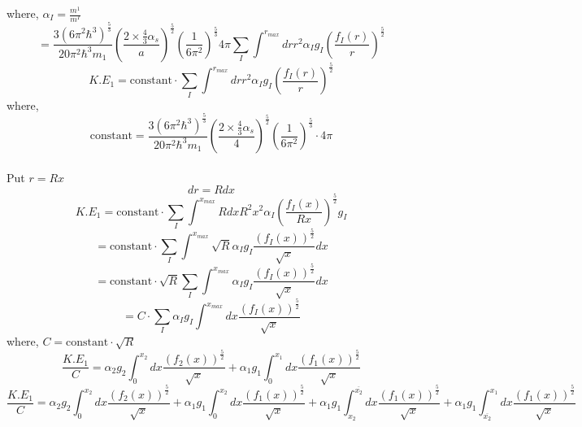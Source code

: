 \documentclass[fleqn, 10pt]{article}
\begin{document}
 where, $\alpha_{I} = \frac{m^{1}}{m^{I}}$
\begin{equation*}
    =  \frac{3(6\pi^{2}\hbar^{3})^\frac{5}{3}}{20 \pi^{2}\hbar^{3}m_{1}} \left( \frac{2 \times \frac{4}{3} \alpha_{s}}{a}\right)^\frac{5}{2} \left( \frac{1}{6\pi^{2}}\right)^\frac{5}{3} 4 \pi \sum_{I} \int^{r_{max}} dr r^{2}\alpha_{I}g_{I} \left( \frac{f_{I}(r)}{r}\right)^\frac{5}{2}
\end{equation*}
\begin{equation}
    K.E_{1} = \text{constant} \cdot \sum_{I} \int^{r_{max}} dr r^{2} \alpha_{I} g_{I} \left( \frac{f_{I}(r)}{r}\right)^\frac{5}{2}
\end{equation}
where, 
\[ \text{constant} = \frac{3 \left( 6 \pi^{2} \hbar^{3} \right)^\frac{5}{3}}{20 \pi^{2} \hbar^{3} m_{1}}  \left( \frac{2 \times \frac{4}{3}\alpha_{s}}{4} \right)^\frac{5}{2} \left( \frac{1}{6\pi^{2}}\right)^\frac{5}{3} \cdot 4 \pi  \] 
\\
Put   $r = Rx$
\[ dr = R dx \]
\begin{equation*}
    K.E_{1} = \text{constant} \cdot \sum_{I} \int^{x_{max}} R dx R^{2} x^{2} \alpha_{I} \left( \frac{f_{I}(x)}{Rx}\right)^\frac{5}{2} g_{I}
\end{equation*}
\begin{equation*}
     = \text{constant} \cdot \sum_{I} \int^{x_{max}} \sqrt{R} \alpha_{I} g_{I} \frac{\left( f_{I}(x)\right)^\frac{5}{2}}{\sqrt{x}} dx 
\end{equation*}
\begin{equation*}
    = \text{constant} \cdot \sqrt{R} \sum_{I} \int^{x_{max}} \alpha_{I} g_{I} \frac{\left( f_{I}(x)\right)^\frac{5}{2}}{\sqrt{x}} dx 
    \end{equation*}
\begin{equation}
     = C \cdot \sum_{I} \alpha_{I} g_{I} \int^{x_{max}} dx \frac{\left( f_{I}(x)\right)^\frac{5}{2}}{\sqrt{x}}
     \end{equation}
where, $ C = \text{constant} \cdot \sqrt{R} $
\begin{equation*}
    \frac{K.E_{1}}{C} = \alpha_{2} g_{2} \int^{x_{2}}_{0} dx \frac{\left( f_{2}(x)\right)^\frac{5}{2}}{\sqrt{x}} + \alpha_{1} g_{1} \int^{x_{1}}_{0} dx \frac{\left( f_{1}(x)\right)^\frac{5}{2}}{\sqrt{x}}
\end{equation*}
\begin{equation*}
    \frac{K.E_{1}}{C}  = \alpha_{2}g_{2} \int^{x_{2}}_{0} dx \frac{\left( f_{2}(x)\right)^\frac{5}{2}}{\sqrt{x}}  + \alpha_{1}g_{1} \int^{x_{2}}_{0} dx \frac{\left( f_{1}(x)\right)^\frac{5}{2}}{\sqrt{x}}  + \alpha_{1}g_{1} \int^{\overline{x_{2}}}_{x_{2}} dx \frac{\left( f_{1}(x)\right)^\frac{5}{2}}{\sqrt{x}} + \alpha_{1}g_{1} \int^{x_{1}}_{\overline{x_{2}}} dx \frac{\left( f_{1}(x)\right)^\frac{5}{2}}{\sqrt{x}}
\end{equation*}
\end{document}
